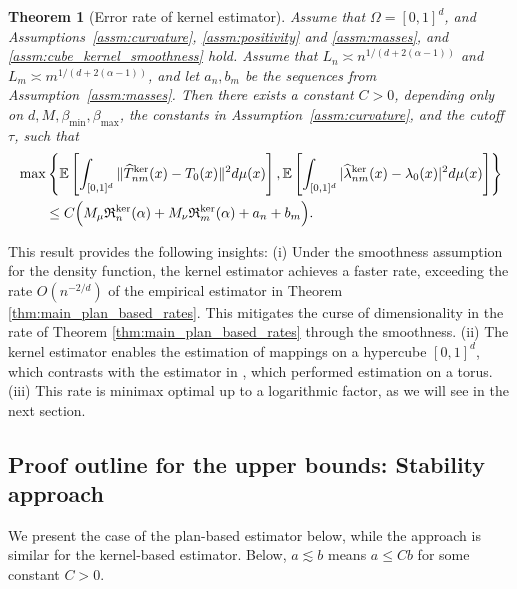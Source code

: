 \documentclass[11pt,reqno]{amsart}
\newtheorem{theorem}{Theorem}
\theoremstyle{definition}
\renewcommand{\hat}{\widehat}
\newcommand{\Ep}{\mathbb{E}}
\begin{document}
\begin{theorem}[Error rate of kernel estimator]
\label{thm:main_cube_kernel_rates}
Assume that $\Omega=[0,1]^d$, and Assumptions~\ref{assm:curvature}, \ref{assm:positivity} and \ref{assm:masses}, and \ref{assm:cube_kernel_smoothness} hold.
Assume that $L_n \asymp n^{1/(d+2(\alpha-1))}$ and $L_m \asymp m^{1/(d+2(\alpha-1))}$, and let $a_n,b_m$ be the sequences from Assumption~\ref{assm:masses}.
Then there exists a constant $C>0$, depending only on $d,M,\beta_{\min},\beta_{\max}$, the constants in Assumption~\ref{assm:curvature}, and the cutoff $\tau$, such that
\begin{align}
    &\max\left\{\Ep\left[
        \int_{[0,1]^d}
        \|\hat T_{nm}^{\mathrm{ker}}(x)-T_0(x)\|^2 d\mu(x)
    \right],
    \Ep\left[
        \int_{[0,1]^d}
        |\hat\lambda_{nm}^{\mathrm{ker}}(x)-\lambda_0(x)|^2 d\mu(x)
    \right] \right\} \\
    &\qquad \le
    C\Bigl(
        M_\mu \mathfrak R_n^{\mathrm{ker}}(\alpha)
        +
        M_\nu \mathfrak R_m^{\mathrm{ker}}(\alpha)
        + a_n+b_m
    \Bigr).\label{eq:section4_cube_kernel_map_rate}
\end{align}
\end{theorem}

This result provides the following insights: (i) Under the smoothness assumption for the density function, the kernel estimator achieves a faster rate, exceeding the rate $O(n^{-2/d})$ of the empirical estimator in Theorem \ref{thm:main_plan_based_rates}. This mitigates the curse of dimensionality in the rate of Theorem \ref{thm:main_plan_based_rates} through the smoothness. (ii) The kernel estimator enables the estimation of mappings on a hypercube $[0,1]^d$, which contrasts with the estimator in \cite{manole2024plugin}, which performed estimation on a torus. (iii) This rate is minimax optimal up to a logarithmic factor, as we will see in the next section.  

\subsection{Proof outline for the upper bounds: Stability approach}
\label{subsec:proof-outline}




We present the case of the plan-based estimator below, while the approach is similar for the kernel-based estimator. Below, $a \lesssim b$ means $a \le Cb$ for some constant $C>0$.
\end{document}
